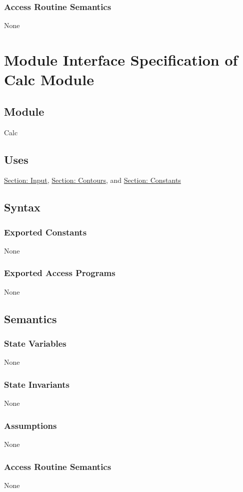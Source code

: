 \documentclass[12pt]{article}
\begin{document}
\subsubsection{Access Routine Semantics}
\label{Sec:AccRoutSemantics}
None
\section{Module Interface Specification of Calc Module}
\label{Sec:Calc}
\subsection{Module}
\label{Sec:Module}
Calc
\subsection{Uses}
\label{Sec:Uses}
\hyperref[Sec:InputADT]{Section: Input}, \hyperref[Sec:ContoursADT]{Section: Contours}, and \hyperref[Sec:ConstantsADT]{Section: Constants}
\subsection{Syntax}
\label{Sec:Syntax}
\subsubsection{Exported Constants}
\label{Sec:ExpConstants}
None
\subsubsection{Exported Access Programs}
\label{Sec:ExpAccPrograms}
None
\subsection{Semantics}
\label{Sec:Semantics}
\subsubsection{State Variables}
\label{Sec:StateVars}
None
\subsubsection{State Invariants}
\label{Sec:StateInvars}
None
\subsubsection{Assumptions}
\label{Sec:Assumps}
None
\subsubsection{Access Routine Semantics}
\label{Sec:AccRoutSemantics}
None
\end{document}
